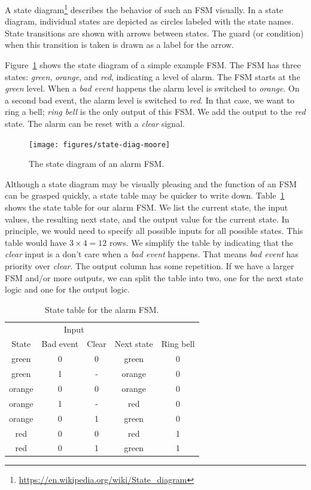 \documentclass[%
    10pt,
    headinclude, footexclude,
    openright, %
    notitlepage,
    cleardoubleempty,
    headsepline,
    pointlessnumbers,
    bibtotoc, idxtotoc,
    ]{scrbook}
\newcommand{\myref}[2]{\href{#1}{#2}}
\renewcommand{\myref}[2]{{#2}{\footnote{\url{#1}}}}
\begin{document}
A \myref{https://en.wikipedia.org/wiki/State_diagram}{state diagram}
describes the behavior of such an FSM visually.
In a state diagram, individual states are depicted as circles labeled
with the state names.
State transitions are shown with arrows between states.
The guard (or condition) when this transition is taken is drawn as a label
for the arrow.

Figure~\ref{fig:diag-moore} shows the state diagram of a simple example FSM.
The FSM has three states: \emph{green}, \emph{orange}, and \emph{red},
indicating a level of alarm. The FSM starts at the \emph{green} level.
When a \emph{bad event} happens the alarm level is switched to \emph{orange}.
On a second bad event, the alarm level is switched to \emph{red}.
In that case, we want to ring a bell; \emph{ring bell} is the only output of this FSM.
We add the output to the \emph{red} state.
The alarm can be reset with a \emph{clear} signal.

\begin{figure}
  \centering
  \texttt{[image: figures/state-diag-moore]}
  \caption{The state diagram of an alarm FSM.}
  \label{fig:diag-moore}
\end{figure}

Although a state diagram may be visually pleasing and the function of an FSM
can be grasped quickly, a state table may be quicker to write down.
Table~\ref{tab:state:table} shows the state table for our alarm FSM.
We list the current state, the input values, the resulting next state, and
the output value for the current state. In principle, we would need to
specify all possible inputs for all possible states. This table would have
$3 \times 4 = 12$ rows. We simplify the table by indicating that the \emph{clear}
input is a don't care when a \emph{bad event} happens. That means
\emph{bad event} has priority over \emph{clear}. The output column
has some repetition. If we have a larger FSM and/or more outputs, we
can split the table into two, one for the next state logic and one for the
output logic.

\begin{table}
\centering
\caption{State table for the alarm FSM.}
\begin{tabular}{ccccc}
\toprule
& \multicolumn{2}{c}{Input} \\
\cmidrule{2-3}
State &  Bad event & Clear & Next state & Ring bell \\
\midrule
green & 0 & 0 & green & 0 \\
green & 1 & - & orange & 0 \\
orange & 0 & 0 & orange & 0 \\
orange & 1 & - & red & 0 \\
orange & 0 & 1 & green & 0 \\
red & 0 & 0 & red & 1 \\
red & 0 & 1 & green & 1 \\
\bottomrule
\end{tabular}
\label{tab:state:table}
\end{table}
\end{document}
